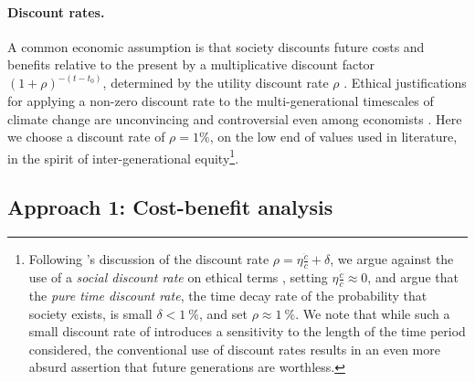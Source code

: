 \documentclass{article}
\begin{document}
\paragraph{Discount rates.} A common economic assumption is that society discounts future costs and benefits relative to the present by a multiplicative discount factor $(1 + \rho)^{-(t-t_{0})}$, determined by the utility discount rate $\rho$ \citep[e.g. see reviews in][]{broome_discounting_1994, stern_economics_2007}. Ethical justifications for applying a non-zero discount rate to the multi-generational timescales of climate change are unconvincing and controversial even among economists \citep{ramsey_mathematical_1928, solow_economics_1974, stern_economics_2007}. Here we choose a discount rate of $\rho = 1\%$, on the low end of values used in literature, in the spirit of inter-generational equity\footnote{Following \cite{stern_economics_2007}'s discussion of the discount rate $\rho = \eta \frac{\dot{c}}{c} + \delta$, we argue against the use of a \textit{social discount rate} on ethical terms \citep{ramsey_mathematical_1928, solow_economics_1974}, setting $\eta \frac{\dot{c}}{c} \approx 0$, and argue that the \textit{pure time discount rate}, the time decay rate of the probability that society exists, is small $\delta < \SI{1}{\%}$, and set $\rho \approx \SI{1}{\%}$. We note that while such a small discount rate of introduces a sensitivity to the length of the time period considered, the conventional use of discount rates results in an even more absurd assertion that future generations are worthless.}. 

\subsection{Approach 1: Cost-benefit analysis}\label{sec.cost_benefit}
\end{document}
